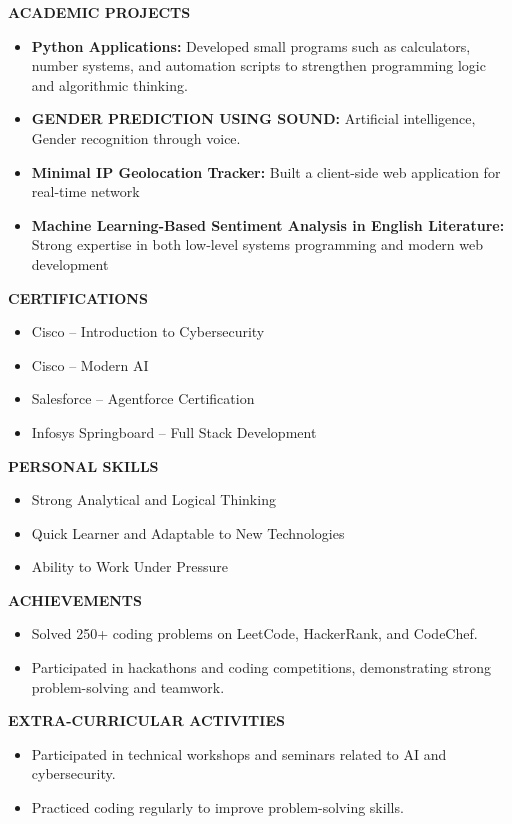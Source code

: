 \documentclass[a4paper,10pt]{article}
\begin{document}
\vspace{3pt}
\textbf{ACADEMIC PROJECTS}

\begin{itemize}
\item \textbf{Python Applications:} Developed small programs such as calculators, number systems, and automation scripts to strengthen programming logic and algorithmic thinking.
\item \textbf{GENDER PREDICTION USING SOUND:} Artificial intelligence, Gender recognition through voice.
\item \textbf{Minimal IP Geolocation Tracker:} Built a client-side web application for real-time network 
\item \textbf{Machine Learning-Based Sentiment Analysis in English Literature:} Strong expertise in both low-level systems programming and modern web development
\end{itemize}
\vspace{3pt}
\textbf{CERTIFICATIONS}

\begin{itemize}
\item Cisco – Introduction to Cybersecurity
\item Cisco – Modern AI
\item Salesforce – Agentforce Certification
\item Infosys Springboard – Full Stack Development
\end{itemize}
\vspace{3pt}
\textbf{PERSONAL SKILLS}

\begin{itemize}
\item Strong Analytical and Logical Thinking
\item Quick Learner and Adaptable to New Technologies
\item Ability to Work Under Pressure
\end{itemize}
\vspace{3pt}
\textbf{ACHIEVEMENTS}

\begin{itemize}
\item Solved 250+ coding problems on LeetCode, HackerRank, and CodeChef.
\item Participated in hackathons and coding competitions, demonstrating strong problem-solving and teamwork.
\end{itemize}
\vspace{3pt}
\textbf{EXTRA-CURRICULAR ACTIVITIES}

\begin{itemize}
\item Participated in technical workshops and seminars related to AI and cybersecurity.
\item Practiced coding regularly to improve problem-solving skills.
\end{itemize}
\end{document}
